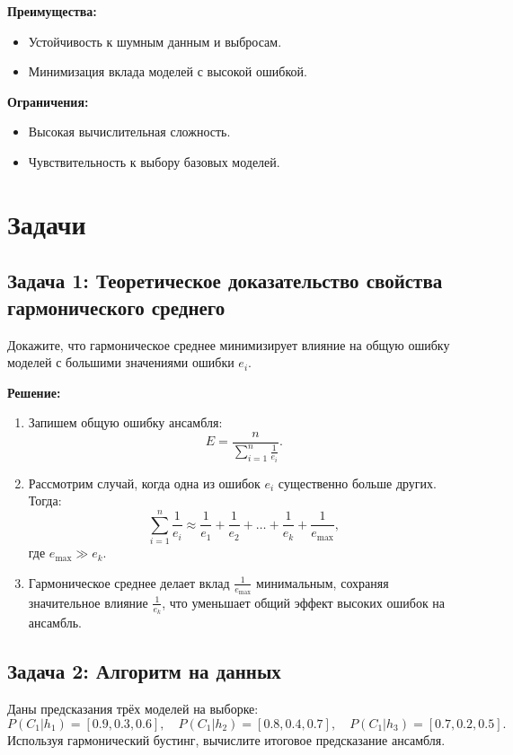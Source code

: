 \textbf{Преимущества:}
\begin{itemize}
    \item Устойчивость к шумным данным и выбросам.
    \item Минимизация вклада моделей с высокой ошибкой.
\end{itemize}

\textbf{Ограничения:}
\begin{itemize}
    \item Высокая вычислительная сложность.
    \item Чувствительность к выбору базовых моделей.
\end{itemize}

\section*{Задачи}

\subsection*{Задача 1: Теоретическое доказательство свойства гармонического среднего}

Докажите, что гармоническое среднее минимизирует влияние на общую ошибку моделей с большими значениями ошибки \( e_i \).

\textbf{Решение:}
\begin{enumerate}
    \item Запишем общую ошибку ансамбля:
    \[
    E = \frac{n}{\sum_{i=1}^n \frac{1}{e_i}}.
    \]
    \item Рассмотрим случай, когда одна из ошибок \( e_i \) существенно больше других. Тогда:
    \[
    \sum_{i=1}^n \frac{1}{e_i} \approx \frac{1}{e_1} + \frac{1}{e_2} + \ldots + \frac{1}{e_k} + \frac{1}{e_{\text{max}}},
    \]
    где \( e_{\text{max}} \gg e_k \).
    \item Гармоническое среднее делает вклад \( \frac{1}{e_{\text{max}}} \) минимальным, сохраняя значительное влияние \( \frac{1}{e_k} \), что уменьшает общий эффект высоких ошибок на ансамбль.
\end{enumerate}

\subsection*{Задача 2: Алгоритм на данных}

Даны предсказания трёх моделей на выборке:
\[
P(C_1 | h_1) = [0.9, 0.3, 0.6], \quad P(C_1 | h_2) = [0.8, 0.4, 0.7], \quad P(C_1 | h_3) = [0.7, 0.2, 0.5].
\]
Используя гармонический бустинг, вычислите итоговое предсказание ансамбля.


